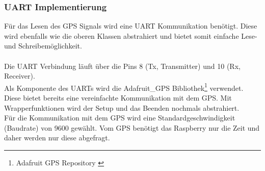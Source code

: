 \subsubsection{UART Implementierung}\label{sec:uart}
Für das Lesen des GPS Signals wird eine UART Kommunikation benötigt. Diese wird ebenfalls wie die oberen Klassen abstrahiert und bietet somit einfache Lese- und Schreibemöglichkeit.\\
\\
Die UART Verbindung läuft über die Pins 8 (Tx, Transmitter) und 10 (Rx, Receiver).\\
Als Komponente des UARTs wird die Adafruit\_GPS Bibliothek\footnote{Adafruit GPS Repository \cite{adafruit}} verwendet. Diese bietet bereits eine vereinfachte  Kommunikation mit dem GPS. Mit Wrapperfunktionen wird der Setup und das Beenden nochmals abstrahiert.\\
Für die Kommunikation mit dem GPS wird eine Standardgeschwindigkeit (Baudrate) von 9600 gewählt. Vom GPS benötigt das Raspberry nur die Zeit und daher werden nur diese abgefragt.
